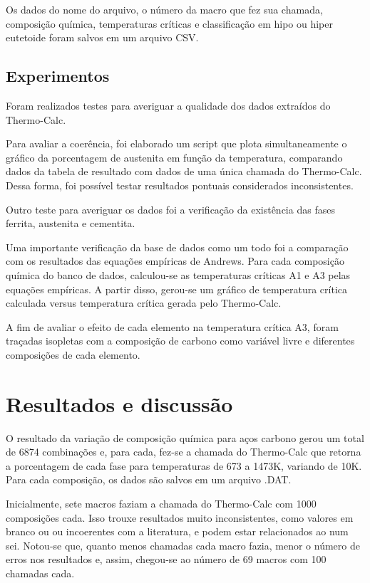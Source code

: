 \documentclass[hidelinks,brazil,dissertacao,epusp]{usp}
\begin{document}
Os dados do nome do arquivo, o número da macro que fez sua chamada, composição química, temperaturas críticas e classificação em hipo ou hiper eutetoide foram salvos em um arquivo CSV.

\section{Experimentos}

Foram realizados testes para averiguar a qualidade dos dados extraídos do Thermo-Calc\textregistered{}.

Para avaliar a coerência, foi elaborado um script que plota simultaneamente o gráfico da porcentagem de austenita em função da temperatura, comparando dados da tabela de resultado com dados de uma única chamada do Thermo-Calc\textregistered{}. Dessa forma, foi possível testar resultados pontuais considerados inconsistentes.

Outro teste para averiguar os dados foi a verificação da existência das fases ferrita, austenita e cementita.

Uma importante verificação da base de dados como um todo foi a comparação com os resultados das equações empíricas de Andrews. Para cada composição química do banco de dados, calculou-se as temperaturas críticas A1 e A3 pelas equações empíricas. A partir disso, gerou-se um gráfico de temperatura crítica calculada versus temperatura crítica gerada pelo Thermo-Calc\textregistered{}. 

A fim de avaliar o efeito de cada elemento na temperatura crítica A3, foram traçadas isopletas com a composição de carbono como variável livre e diferentes composições de cada elemento.


\chapter{Resultados e discussão}

O resultado da variação de composição química para aços carbono gerou um total de 6874 combinações e, para cada, fez-se a chamada do Thermo-Calc\textregistered{} que retorna a porcentagem de cada fase para temperaturas de 673 a 1473K, variando de 10K. Para cada composição, os dados são salvos em um arquivo .DAT.

Inicialmente, sete macros faziam a chamada do Thermo-Calc\textregistered{} com 1000 composições cada. Isso trouxe resultados muito inconsistentes, como valores em branco ou ou incoerentes com a literatura, e podem estar relacionados ao num sei. Notou-se que, quanto menos chamadas cada macro fazia, menor o número de erros nos resultados e, assim, chegou-se ao número de 69 macros com 100 chamadas cada.
\end{document}
